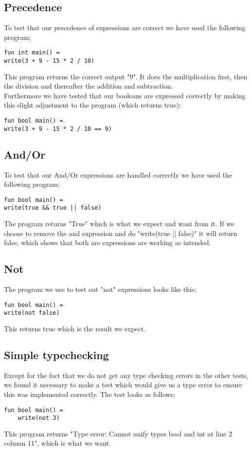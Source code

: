 \documentclass[12pt]{article}
\begin{document}
\subsection{Precedence}
To test that our precedence of expressions are correct we have used the following program;
\begin{verbatim}
fun int main() =
write(3 + 9 - 15 * 2 / 10)
\end{verbatim}
This program returns the correct output "9". It does the multiplication first, then the division and thereafter the addition and subtraction.\\
Furthermore we have tested that our booleans are expressed correctly by making this slight adjustment to the program (which returns true);
\begin{verbatim}
fun bool main() =
write(3 + 9 - 15 * 2 / 10 == 9)
\end{verbatim}
\subsection{And/Or}
To test that our And/Or expressions are handled correctly we have used the following program;
\begin{verbatim}
fun bool main() =
write(true && true || false)
\end{verbatim}
The program returns "True" which is what we expect and want from it. If we choose to remove the and expression and do "write(true || false)" it will return false, which shows that both are expressions are working as intended.
\subsection{Not}
The program we use to test out "not" expressions looks like this;
\begin{verbatim}
fun bool main() =
write(not false)
\end{verbatim}
This returns true which is the result we expect.
\subsection{Simple typechecking}
Except for the fact that we do not get any type checking errors in the other tests, we found it necessary to make a test which would give us a type error to ensure this was implemented correctly. The test looks as follows;
\begin{verbatim}
fun bool main() =
    write(not 3)
\end{verbatim}
This program returns "Type error: Cannot unify types bool and int at line 2 column 11", which is what we want.
\end{document}

